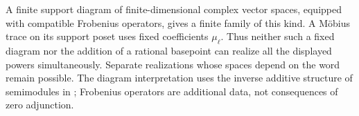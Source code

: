 A finite support diagram of finite-dimensional complex vector spaces, equipped with compatible Frobenius operators, gives a finite family of this kind. A M\"obius trace on its support poset uses fixed coefficients $\mu_\ell$. Thus neither such a fixed diagram nor the addition of a rational basepoint can realize all the displayed powers simultaneously. Separate realizations whose spaces depend on the word remain possible. The diagram interpretation uses the inverse additive structure of semimodules in \citet[Proposition~6.1]{FGJM}; Frobenius operators are additional data, not consequences of zero adjunction.
